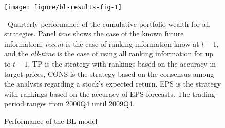 \documentclass{article}\usepackage[]{graphicx}\usepackage[]{color}
\newcommand{\tr}{\textit{true}}
\newcommand{\naive}{\textit{recent}}
\newcommand{\default}{\textit{all-time}}
\begin{document}
\begin{figure}[ht]
\begin{center}
\texttt{[image: figure/bl-results-fig-1]}
\end{center}
\caption{Performance of the BL model}
\label{fig:bl-results}
\ Quarterly performance of the cumulative portfolio wealth for all strategies. Panel \tr{} shows the case of the known future information; \naive{} is the case of ranking information know at $t-1$, and the \default{} is the case of using all ranking information for up to $t-1$. TP is the strategy with rankings based on the accuracy in target prices, CONS is the strategy based on the consensus among the analysts regarding a stock's expected return. EPS is the strategy with rankings based on the accuracy of EPS forecasts. The trading period ranges from 2000Q4 until 2009Q4.
\end{figure}
\end{document}
